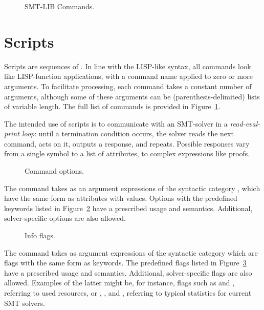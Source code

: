 \begin{figure}%
\small
\cCommands
\caption{SMT-LIB Commands.}
\label{fig:commands}
\end{figure}


\section{Scripts}  \label{sec:scripts}

Scripts are sequences of .  
In line with the LISP-like syntax, all commands look like 
LISP-function applications, with a command name applied to zero or more arguments.
To facilitate processing, each command takes a constant number of arguments,
although some of these arguments can be (parenthesis-delimited) lists 
of variable length.
The full list of commands is provided in Figure~\ref{fig:commands}.

The intended use of scripts is to communicate with an SMT-solver 
in a \emph{read-eval-print loop}: until a termination condition occurs, 
the solver reads the next command, acts on it, outputs a response, and repeats.
Possible responses vary from a single symbol to a list of attributes, 
to complex expressions like proofs.


\begin{figure}
\small
\cCommandOptions
\caption{Command options.}
\label{fig:command-options}
\end{figure}

The command  takes as an argument expressions 
of the syntactic category , which have the same form 
as attributes with values.
Options with the predefined keywords listed in Figure~\ref{fig:command-options} 
have a prescribed usage and semantics.
Additional, solver-specific options are also allowed.


\begin{figure}
\small
\cInfoFlags
\caption{Info flags.}
\label{fig:info-flags}
\end{figure}

The command  takes as argument 
expressions of the syntactic category 
which are flags with the same form as keywords.
The predefined flags listed in Figure~\ref{fig:info-flags} have 
a prescribed usage and semantics.
Additional, solver-specific flags are also allowed.
Examples of the latter might be, for instance, flags such as
 and , referring to used resources, or  
, , and ,
referring to typical statistics for current SMT solvers. 

